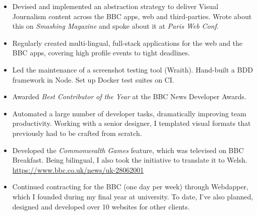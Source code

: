 \documentclass[10pt,a4paper,ragged2e,withhyper]{altacv}
\begin{document}
\begin{paracol}{2}
\divider


\begin{itemize}
    \item Devised and implemented an abstraction strategy to deliver Visual Journalism content across the BBC apps, web and third-parties. Wrote about this on \emph{Smashing Magazine} and spoke about it at \emph{Paris Web Conf}.
    \item Regularly created multi-lingual, full-stack applications for the web and the BBC apps, covering high profile events to tight deadlines.
\end{itemize}

\divider


\begin{itemize}
    \item Led the maintenance of a screenshot testing tool (Wraith). Hand-built a BDD framework in Node. Set up Docker test suites on CI.
    \item Awarded \emph{Best Contributor of the Year} at the BBC News Developer Awards.
\end{itemize}

\divider


\begin{itemize}
    \item Automated a large number of developer tasks, dramatically improving team productivity. Working with a senior designer, I templated visual formats that previously had to be crafted from scratch.
    \item Developed the \emph{Commonwealth Games} feature, which was televised on BBC Breakfast. Being bilingual, I also took the initiative to translate it to Welsh. \url{https://www.bbc.co.uk/news/uk-28062001}
\end{itemize}

\divider


\begin{itemize}
    \item Continued contracting for the BBC (one day per week) through Webdapper, which I founded during my final year at university. To date, I've also planned, designed and developed over 10 websites for other clients.
\end{itemize}


\end{paracol}
\end{document}
